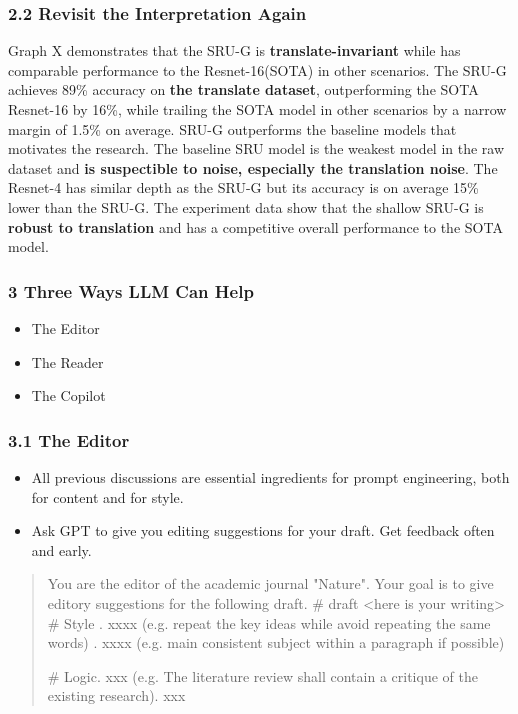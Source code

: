 \documentclass{beamer}
\begin{document}
    
    \begin{frame}
        \frametitle{2.2 Revisit the Interpretation Again}
        Graph X demonstrates that the SRU-G is \textbf{translate-invariant} while has comparable performance to the Resnet-16(SOTA) in other scenarios.
        The SRU-G achieves 89\% accuracy on \textbf{the translate dataset}, outperforming the SOTA Resnet-16 by 16\%, while trailing the SOTA model in other scenarios by a narrow margin of 1.5\% on average.
        SRU-G outperforms the baseline models that motivates the research. The baseline SRU model is the weakest model in the raw dataset and \textbf{is suspectible to noise, especially the translation noise}. The Resnet-4 has similar depth as the SRU-G but its accuracy is on average 15\% lower than the SRU-G.
        The experiment data show that the shallow SRU-G is \textbf{robust to translation} and has a competitive overall performance to the SOTA model.
    \end{frame}
    
    \begin{frame}
        \frametitle{3 Three Ways LLM Can Help}
        \begin{itemize}
            \item The Editor
            \item The Reader
            \item The Copilot
        \end{itemize}
\end{frame}

\begin{frame}
    \frametitle{3.1 The Editor}
    \begin{itemize}
        \item All previous discussions are essential ingredients for prompt engineering, both for content and for style.
        \item Ask GPT to give you editing suggestions for your draft. Get feedback often and early.
    \end{itemize}
    
    \begin{quote}
        You are the editor of the academic journal "Nature". Your goal is to give editory suggestions for the following draft.
        \newline
        \# draft \newline
        <here is your writing>
        \newline
        \# Style . xxxx (e.g. repeat the key ideas while avoid repeating the same words) . xxxx (e.g. main consistent subject within a paragraph if possible) \newline
    
        \# Logic. xxx (e.g. The literature review shall contain a critique of the existing research). xxx\newline
    \end{quote}
    
\end{frame}   
\end{document}
